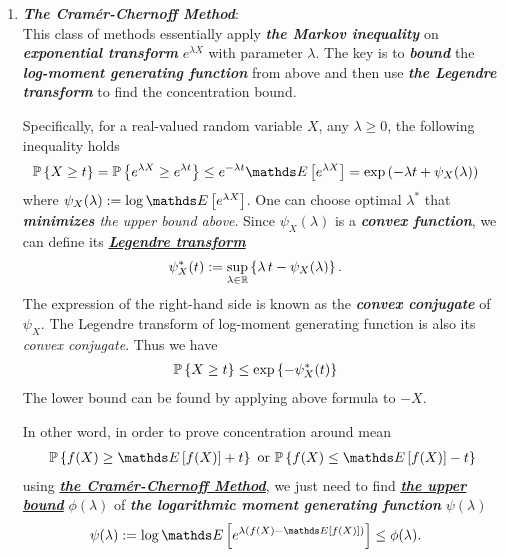 \documentclass[11pt]{article}
\begin{document}
\begin{enumerate}
\item \emph{\textbf{The Cram{\'e}r-Chernoff Method}}:\\
This class of methods essentially apply \emph{\textbf{the Markov inequality}} on \emph{\textbf{exponential transform}} $e^{\lambda X}$ with parameter $\lambda$. The key is to \emph{\textbf{bound}} the \emph{\textbf{log-moment generating function}} from above and then use \emph{\textbf{the Legendre transform}} to find the concentration bound. 

Specifically, for a real-valued random variable $X$, any $\lambda \ge 0$, the following inequality holds
\begin{align*}
\bP\set{X \ge t} = \bP\set{e^{\lambda X} \ge e^{\lambda t}} &\le e^{-\lambda t} \E{}{e^{\lambda X}} = \exp\paren{-\lambda t + \psi_{X}(\lambda) }
\end{align*} where $\psi_{X}(\lambda) := \log   \E{}{e^{\lambda X}}$. One can choose optimal $\lambda^{*}$ that \emph{\textbf{minimizes} the upper bound above}.
Since $\psi_{X}(\lambda)$ is a \emph{\textbf{convex function}}, we can define its \underline{\emph{\textbf{Legendre transform}}}
\begin{align*}
\psi^{*}_{X}(t) &:= \sup_{\lambda \in {\mathbb R}}\left\{\lambda\,t - \psi_{X}(\lambda)\right\}.
\end{align*} The expression of the right-hand side is known as the \textbf{\emph{convex conjugate}} of $\psi_{X}$. The Legendre transform of log-moment generating function is also its \emph{convex conjugate}.  Thus we have
\begin{align*}
{\mathbb P}\left\{X \ge t\right\}  &\le \exp\left\{- \psi^{*}_{X}(t)\right\}
\end{align*}
The lower bound can be found by applying above formula  to $-X$. %

In other word, in order to prove concentration around mean 
\begin{align*}
\bP\set{f(X) \ge  \E{}{f(X)} + t} \text{ or } \bP\set{f(X) \le  \E{}{f(X)} - t}
\end{align*}
using \underline{\textbf{\emph{the Cram\'er-Chernoff Method}}}, we just need to find \underline{\emph{\textbf{the upper bound}}} $\phi(\lambda)$ of \emph{\textbf{the logarithmic moment generating function}} $\psi(\lambda) $
\begin{align*}
\psi(\lambda) := \log \E{}{e^{\lambda (f(X) - \E{}{f(X)})}} &\le \phi(\lambda).
\end{align*}


\end{enumerate}
\end{document}
